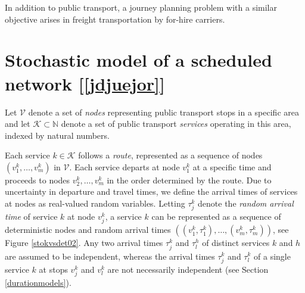 \documentclass[dissertation,draft*]{aaltoseries}
\begin{document}
In addition to public transport, a journey planning problem with a similar objective 
arises in freight transportation by for-hire carriers. 


\section{Stochastic model of a scheduled network [\ref{jdjuejor}]}
Let $\mathcal{V}$ denote a set of \emph{nodes} representing public transport stops
in a specific area and let $\mathcal{K} \subset \mathbb{N}$ denote a set of public 
transport \emph{services} operating in this area, indexed by natural numbers. 

Each service $k \in \mathcal{K}$ follows a \emph{route}, represented as a sequence of nodes $(v_1^k,\ldots,v_m^k)$ in $\mathcal{V}$. 
Each service departs at node $v_1^k$ at a specific time and proceeds to nodes $v_2^k, \ldots,v_m^k$ in the order determined by the route.
Due to uncertainty in departure and travel times, we define the arrival times of services at nodes
as real-valued random variables. Letting $\tau_j^k$ denote the \emph{random arrival time} of 
service $k$ at node $v_j^k$, 
a service $k$ can be represented as a sequence of deterministic nodes and random arrival 
times $((v_1^k, \tau_1^k), \ldots, (v_m^k, \tau_m^k))$, see Figure \ref{stokvsdet02}.
Any two arrival times $\tau_j^k$ and $\tau_l^h$ of 
distinct services $k$ and $h$ are assumed to be independent,
whereas the arrival times $\tau_j^k$ and $\tau_l^k$ of a single 
service $k$ at stops $v_j^k$ and $v_l^k$ are not necessarily independent (see Section \ref{durationmodels}).
\end{document}
